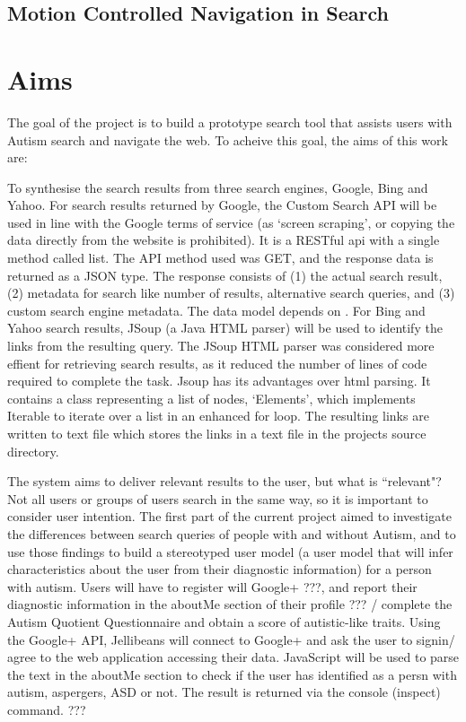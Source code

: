 \documentclass[a4paper, 11pt]{article}
\begin{document}
\subsection {Motion Controlled Navigation in Search}


\section {Aims}
The goal of the project is to build a prototype search tool that assists users with Autism search and navigate the web. To acheive this goal, the aims of this work are:

To synthesise the search results from three search engines, Google, Bing and Yahoo. For search results returned by Google, the Custom Search API will be used in line with the Google terms of service (as `screen scraping', or copying the data directly from the website is prohibited). It is a RESTful api with a single method called list. The API method used was GET, and the response data is returned as a JSON type. The response consists of (1) the actual search result, (2) metadata for search like number of  results, alternative search queries, and (3) custom search engine metadata. The data model depends on \cite{opensearch}.
For Bing and Yahoo search results, JSoup (a Java HTML parser) will be used to identify the links from the resulting query. The JSoup HTML parser was considered more effient for retrieving search results, as it reduced the number of lines of code required to complete the task. 
Jsoup has its advantages over html parsing. It contains a class representing a list of nodes, `Elements', which implements Iterable to iterate over a list in an enhanced for loop.
The resulting links are written to text file which stores the links in a text file in the projects source directory.

The system aims to deliver relevant results to the user, but what is ``relevant"? Not all users or groups of users search in the same way, so it is important to consider user intention. The first part of the current project aimed to investigate the differences between search queries of people with and without Autism, and to use those findings to build a stereotyped user model (a user model that will infer characteristics about the user from their diagnostic information) for a person with autism. Users will have to register will Google+ ???, and report their diagnostic information in the aboutMe section of their profile ??? / complete the Autism Quotient Questionnaire and obtain a score of autistic-like traits. Using the Google+ API, Jellibeans will connect to Google+ and ask the user to signin/ agree to the web application accessing their data. JavaScript will be used to parse the text in the aboutMe section to check if the user has identified as a persn with autism, aspergers, ASD or not. The result is returned via the console (inspect) command. ??? 
\end{document}
